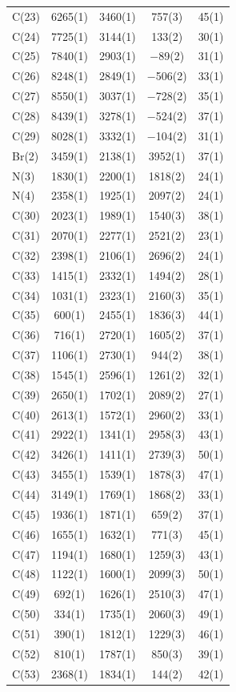 \begin{center}
{\begin{supertabular}{lcccc}
C(23)&6265(1)&3460(1)&757(3)&45(1)\\
C(24)&7725(1)&3144(1)&133(2)&30(1)\\
C(25)&7840(1)&2903(1)&$-$89(2)&31(1)\\
C(26)&8248(1)&2849(1)&$-$506(2)&33(1)\\
C(27)&8550(1)&3037(1)&$-$728(2)&35(1)\\
C(28)&8439(1)&3278(1)&$-$524(2)&37(1)\\
C(29)&8028(1)&3332(1)&$-$104(2)&31(1)\\
Br(2)&3459(1)&2138(1)&3952(1)&37(1)\\
N(3)&1830(1)&2200(1)&1818(2)&24(1)\\
N(4)&2358(1)&1925(1)&2097(2)&24(1)\\
C(30)&2023(1)&1989(1)&1540(3)&38(1)\\
C(31)&2070(1)&2277(1)&2521(2)&23(1)\\
C(32)&2398(1)&2106(1)&2696(2)&24(1)\\
C(33)&1415(1)&2332(1)&1494(2)&28(1)\\
C(34)&1031(1)&2323(1)&2160(3)&35(1)\\
C(35)&600(1)&2455(1)&1836(3)&44(1)\\
C(36)&716(1)&2720(1)&1605(2)&37(1)\\
C(37)&1106(1)&2730(1)&944(2)&38(1)\\
C(38)&1545(1)&2596(1)&1261(2)&32(1)\\
C(39)&2650(1)&1702(1)&2089(2)&27(1)\\
C(40)&2613(1)&1572(1)&2960(2)&33(1)\\
C(41)&2922(1)&1341(1)&2958(3)&43(1)\\
C(42)&3426(1)&1411(1)&2739(3)&50(1)\\
C(43)&3455(1)&1539(1)&1878(3)&47(1)\\
C(44)&3149(1)&1769(1)&1868(2)&33(1)\\
C(45)&1936(1)&1871(1)&659(2)&37(1)\\
C(46)&1655(1)&1632(1)&771(3)&45(1)\\
C(47)&1194(1)&1680(1)&1259(3)&43(1)\\
C(48)&1122(1)&1600(1)&2099(3)&50(1)\\
C(49)&692(1)&1626(1)&2510(3)&47(1)\\
C(50)&334(1)&1735(1)&2060(3)&49(1)\\
C(51)&390(1)&1812(1)&1229(3)&46(1)\\
C(52)&810(1)&1787(1)&850(3)&39(1)\\
C(53)&2368(1)&1834(1)&144(2)&42(1)\\

\end{supertabular}}
\end{center}
